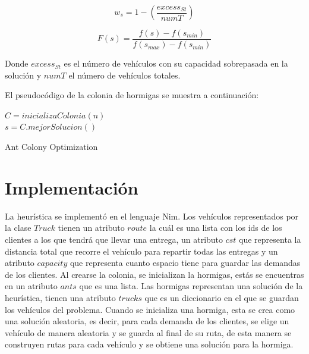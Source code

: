 \documentclass[12pt]{article}
\begin{document}
	\[w_s=1-(\frac{excess_{St}}{numT})\]
	
	\[F(s)=\frac{f(s)-f(s_{min})}{f(s_{max})-f(s_{min})} \]
	
	Donde $excess_{St}$ es el número de vehículos con su capacidad sobrepasada en 
	la solución y $numT$ el número de vehículos totales.
	
	El pseudocódigo de la colonia de hormigas se muestra a continuación:
	
	\begin{algorithm}[H]
		\SetAlgoLined
		$C=inicializaColonia(n)$\\
		$s=C.mejorSolucion()$\\
		\caption{Ant Colony Optimization}
	\end{algorithm}
	\section{Implementación}
	La heurística se implementó en el lenguaje Nim.
	Los vehículos representados por la clase $Truck$ tienen un atributo $route$ la cuál es una lista con los ids de los clientes a los que tendrá que llevar una entrega,
	un atributo $cst$ que representa la distancia total que recorre el vehículo para
	repartir todas las entregas y un atributo $capacity$ que representa cuanto 
	espacio tiene para guardar las demandas de los clientes.
	Al crearse la colonia, se inicializan la hormigas, estás se encuentras en un 
	atributo $ants$ que es una lista.
	Las hormigas representan una solución de la heurística, tienen una atributo 
	$trucks$ que es un diccionario en el que se guardan los vehículos del problema.
	Cuando se inicializa una hormiga, esta se crea como una solución aleatoria, es 
	decir, para cada demanda de los clientes, se elige un vehículo de manera 
	aleatoria y se guarda al final de su ruta, de esta manera se construyen rutas
	para cada vehículo y se obtiene una solución para la hormiga.
	
\end{document}

